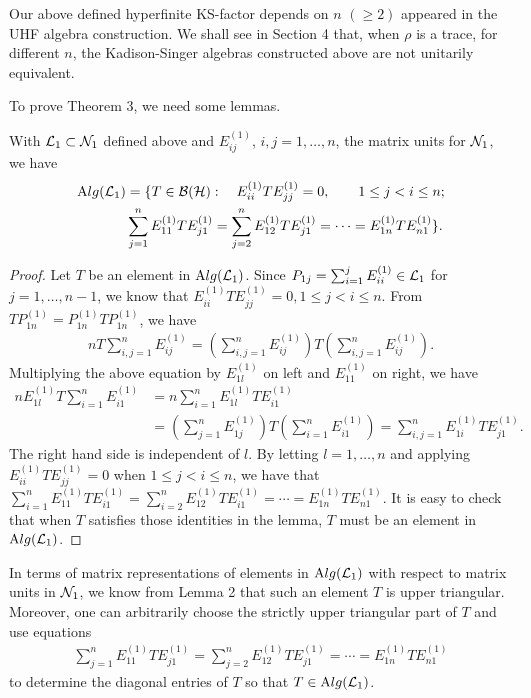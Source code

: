 Our above defined hyperfinite KS-factor depends on $n$ $(\geq 2)$
appeared in the UHF algebra construction. We shall see in Section
4 that, when $\rho$ is a trace, for different $n$, the
Kadison-Singer algebras constructed above are not unitarily
equivalent.

To prove Theorem 3, we need some lemmas.

\begin{lemma} 
With $\mathcal L_1\subset\mathcal N_1$ defined above and $E_{ij}^{(1)}$,
$i,j=1,\ldots,n$, the matrix units for $\mathcal N_1$, we have
\begin{align*}
\mathrm Alg(\mathcal L_1)&=\{ T\in\mathcal B(\mathcal H):  \quad E_{ii}^{(1)}TE_{jj}^{(1)}=0,
\qquad 1\leq j < i\leq n; \\
& \sum_{j=1}^n E_{11}^{(1)} TE_{j1}^{(1)}=
\sum_{j=2}^n E_{12}^{(1)}T
E_{j1}^{(1)}=\cdots=E_{1n}^{(1)}TE_{n1}^{(1)}\}.
\end{align*}
\end{lemma}

\begin{proof}
 Let $T$ be an element in
$\mathrm Alg(\mathcal L_1)$. Since $P_{1j}=\sum_{i=1}^j E_{ii}^{(1)}\in\mathcal L_1$ for
$j=1,\ldots,n-1$, we know that $E_{ii}^{(1)}TE_{jj}^{(1)}=0, 1\leq
j<i\leq n$. From $TP_{1n}^{(1)}=P_{1n}^{(1)}TP_{1n}^{(1)}$, we have
\begin{align*}
nT\sum_{i,j=1}^n E_{ij}^{(1)}=(\sum_{i,j=1}^n E_{ij}^{(1)} )T(
\sum_{i,j=1}^n E_{ij}^{(1)}) .
\end{align*}
Multiplying the above equation by $E_{1l}^{(1)}$ on left and
$E_{11}^{(1)}$ on right, we have
\begin{align*}
nE_{1l}^{(1)}T\sum_{i=1}^nE_{i1}^{(1)}&=n\sum_{i=1}^n E_{1l}^{(1)}
TE_{i1}^{(1)}\\
&=(\sum_{j=1}^nE_{1j}^{(1)})T (\sum_{i=1}^n
E_{i1}^{(1)})=\sum_{i,j=1}^n E_{1i}^{(1)} T E_{j1}^{(1)} .
\end{align*}
The right hand side is independent of $l$. By letting $l=1,\ldots,
n$ and applying $E_{ii}^{(1)}TE_{jj}^{(1)}=0$ when $1\leq j<i\leq
n$, we have that $\sum_{i=1}^n E_{11}^{(1)} TE_{i1}^{(1)}=
\sum_{i=2}^n E_{12}^{(1)}T
E_{i1}^{(1)}=\cdots=E_{1n}^{(1)}TE_{n1}^{(1)}$. It is easy to
check that when $T$ satisfies those identities in the lemma, $T$
must be an element in $\mathrm Alg(\mathcal L_1)$.
\end{proof}

In terms of matrix representations of elements in $\mathrm Alg(\mathcal L_1)$
with respect to matrix units in $\mathcal N_1$, we know from Lemma 2
that such an element $T$ is upper triangular. Moreover, one can
arbitrarily choose the strictly upper triangular part of $T$ and
use equations
\begin{align*}
\sum_{j=1}^n E_{11}^{(1)} TE_{j1}^{(1)}=
\sum_{j=2}^n E_{12}^{(1)}T
E_{j1}^{(1)}=\cdots=E_{1n}^{(1)}TE_{n1}^{(1)}
\end{align*}
to determine the diagonal entries of $T$ so that $T\in\mathrm Alg(\mathcal L_1)$. 


